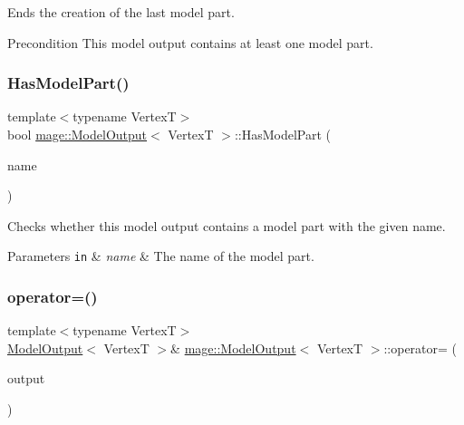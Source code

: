 Ends the creation of the last model part.

\begin{DoxyPrecond}{Precondition}
This model output contains at least one model part. 
\end{DoxyPrecond}
\hypertarget{structmage_1_1_model_output_a90c6d42d13813b9c340bd1a250276a8d}{}\label{structmage_1_1_model_output_a90c6d42d13813b9c340bd1a250276a8d} 
\subsubsection{\texorpdfstring{Has\+Model\+Part()}{HasModelPart()}}
{\footnotesize\ttfamily template$<$typename VertexT$>$ \\
bool \hyperlink{structmage_1_1_model_output}{mage\+::\+Model\+Output}$<$ VertexT $>$\+::Has\+Model\+Part (\begin{DoxyParamCaption}\item[{const string \&}]{name }\end{DoxyParamCaption})\hspace{0.3cm}{\ttfamily [noexcept]}}

Checks whether this model output contains a model part with the given name.


\begin{DoxyParams}[1]{Parameters}
\mbox{\tt in}  & {\em name} & The name of the model part. \\
\hline
\end{DoxyParams}
\hypertarget{structmage_1_1_model_output_ada52bf380c0259a0d7ef855457e5a9da}{}\label{structmage_1_1_model_output_ada52bf380c0259a0d7ef855457e5a9da} 
\subsubsection{\texorpdfstring{operator=()}{operator=()}\hspace{0.1cm}{\footnotesize\ttfamily [1/2]}}
{\footnotesize\ttfamily template$<$typename VertexT$>$ \\
\hyperlink{structmage_1_1_model_output}{Model\+Output}$<$ VertexT $>$\& \hyperlink{structmage_1_1_model_output}{mage\+::\+Model\+Output}$<$ VertexT $>$\+::operator= (\begin{DoxyParamCaption}\item[{const \hyperlink{structmage_1_1_model_output}{Model\+Output}$<$ VertexT $>$ \&}]{output }\end{DoxyParamCaption})\hspace{0.3cm}{\ttfamily [delete]}}

